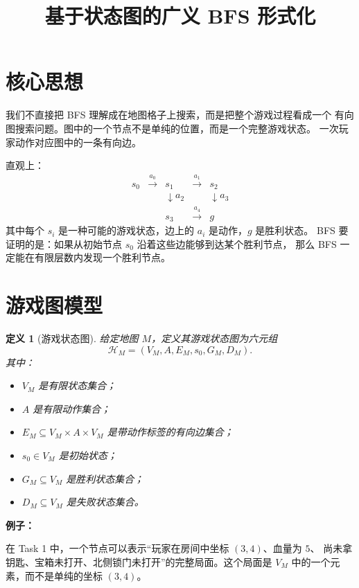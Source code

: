 \documentclass[UTF8]{ctexart}
\title{基于状态图的广义 BFS 形式化}
\author{}
\date{}
\theoremstyle{nesylinkblock}
\newtheorem{definition}{定义}
\newenvironment{examplebox}
  {\begin{center}\begin{lrbox}{\exampleboxcontent}\begin{minipage}{0.92\linewidth}
   \textbf{例子：}\par\smallskip}
  {\end{minipage}\end{lrbox}\fbox{\usebox{\exampleboxcontent}}\end{center}}
\begin{document}
\maketitle

\section{核心思想}

我们不直接把 BFS 理解成在地图格子上搜索，而是把整个游戏过程看成一个
有向图搜索问题。图中的一个节点不是单纯的位置，而是一个完整游戏状态。
一次玩家动作对应图中的一条有向边。

直观上：
\[
\begin{array}{ccccc}
s_0 & \xrightarrow{a_0} & s_1 & \xrightarrow{a_1} & s_2 \\
    &                   & \downarrow a_2        &                   & \downarrow a_3 \\
    &                   & s_3                   & \xrightarrow{a_4} & g
\end{array}
\]
其中每个 $s_i$ 是一种可能的游戏状态，边上的 $a_i$ 是动作，$g$ 是胜利状态。
BFS 要证明的是：如果从初始节点 $s_0$ 沿着这些边能够到达某个胜利节点，
那么 BFS 一定能在有限层数内发现一个胜利节点。

\section{游戏图模型}

\begin{definition}[游戏状态图]
给定地图 $M$，定义其游戏状态图为六元组
\[
  \mathcal{H}_M = (V_M, A, E_M, s_0, G_M, D_M).
\]
其中：
\begin{itemize}[leftmargin=2em]
  \item $V_M$ 是有限状态集合；
  \item $A$ 是有限动作集合；
  \item $E_M \subseteq V_M\times A\times V_M$ 是带动作标签的有向边集合；
  \item $s_0\in V_M$ 是初始状态；
  \item $G_M\subseteq V_M$ 是胜利状态集合；
  \item $D_M\subseteq V_M$ 是失败状态集合。
\end{itemize}
\end{definition}

\begin{examplebox}
在 Task 1 中，一个节点可以表示“玩家在房间中坐标 $(3,4)$、血量为 $5$、
尚未拿钥匙、宝箱未打开、北侧锁门未打开”的完整局面。这个局面是 $V_M$
中的一个元素，而不是单纯的坐标 $(3,4)$。
\end{examplebox}
\end{document}
